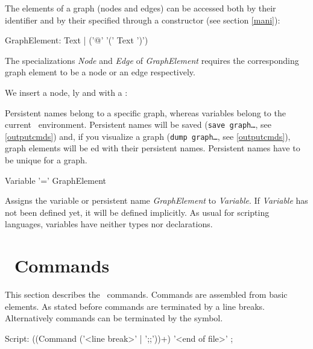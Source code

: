 The elements of a graph (nodes and edges) can be accessed both by their  identifier and by their  specified through a constructor (see section \ref{mani}):
\makeatletter
\begin{rail}
  GraphElement: Text | ('@' '(' Text ')')
\end{rail}
\makeatother
The specializations \emph{Node} and \emph{Edge} of \emph{GraphElement} requires the corresponding graph element to be a node or an edge respectively.
\begin{example}
\label{persistentex} 
We insert a node, ly and with a :
\end{example}
\begin{note}
Persistent names belong to a specific graph, whereas variables belong to the current \GrShell\ environment. Persistent names will be saved (\texttt{save graph\dots}, see \ref{outputcmds}) and, if you visualize a graph (\texttt{dump graph\dots}, see \ref{outputcmds}), graph elements will be ed with their persistent names. Persistent names have to be unique for a graph.
\end{note}

\begin{rail}
  Variable '=' GraphElement   
\end{rail}
Assigns the variable or persistent name \emph{GraphElement} to \emph{Variable}. If \emph{Variable} has not been defined yet, it will be defined implicitly. As usual for scripting languages, variables have neither types nor declarations.

\section{\GrShell\ Commands}
This section describes the \GrShell\ commands. Commands are assembled from basic elements. As stated before commands are terminated by a line breaks. Alternatively commands can be terminated by the \indexed{\texttt{;;}} symbol.
\begin{rail}
  Script: ((Command ('<line break>' | ';;'))+) '<end of file>' ;
\end{rail}

